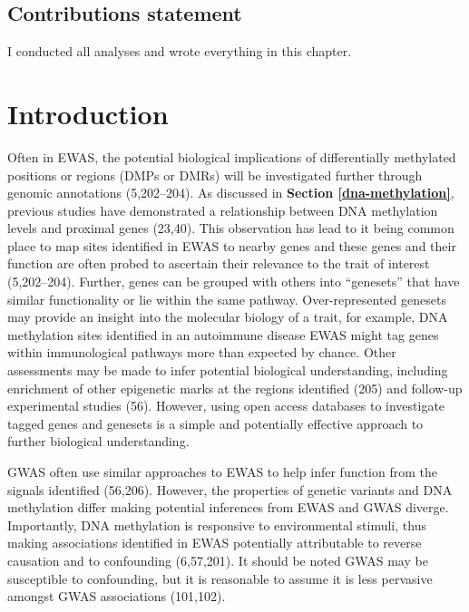 \documentclass[11pt,twoside]{bristolthesis}
\begin{document}
\hypertarget{contributions-statement-06}{%
\subsection{Contributions statement}\label{contributions-statement-06}}

I conducted all analyses and wrote everything in this chapter.

\hypertarget{introduction-06}{%
\section{Introduction}\label{introduction-06}}

Often in EWAS, the potential biological implications of differentially methylated positions or regions (DMPs or DMRs) will be investigated further through genomic annotations (5,202--204). As discussed in \textbf{Section \ref{dna-methylation}}, previous studies have demonstrated a relationship between DNA methylation levels and proximal genes (23,40). This observation has lead to it being common place to map sites identified in EWAS to nearby genes and these genes and their function are often probed to ascertain their relevance to the trait of interest (5,202--204). Further, genes can be grouped with others into ``genesets'' that have similar functionality or lie within the same pathway. Over-represented genesets may provide an insight into the molecular biology of a trait, for example, DNA methylation sites identified in an autoimmune disease EWAS might tag genes within immunological pathways more than expected by chance. Other assessments may be made to infer potential biological understanding, including enrichment of other epigenetic marks at the regions identified (205) and follow-up experimental studies (56). However, using open access databases to investigate tagged genes and genesets is a simple and potentially effective approach to further biological understanding.

GWAS often use similar approaches to EWAS to help infer function from the signals identified (56,206). However, the properties of genetic variants and DNA methylation differ making potential inferences from EWAS and GWAS diverge. Importantly, DNA methylation is responsive to environmental stimuli, thus making associations identified in EWAS potentially attributable to reverse causation and to confounding (6,57,201). It should be noted GWAS may be susceptible to confounding, but it is reasonable to assume it is less pervasive amongst GWAS associations (101,102).
\end{document}
